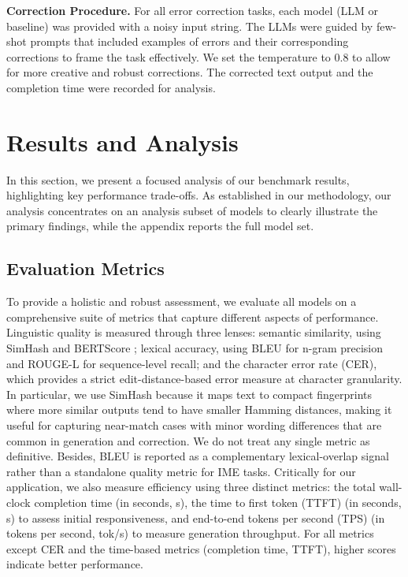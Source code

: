 \documentclass[10pt, a4paper]{article}
\begin{document}
\textbf{Correction Procedure.}
For all error correction tasks, each model (LLM or baseline) was provided with a noisy input string. The LLMs were guided by few-shot prompts that included examples of errors and their corresponding corrections to frame the task effectively. We set the {temperature} to 0.8 to allow for more creative and robust corrections. The corrected text output and the completion time were recorded for analysis.

\section{Results and Analysis}
\label{sec:results}

In this section, we present a focused analysis of our benchmark results, highlighting key performance trade-offs. As established in our methodology, our analysis concentrates on an analysis subset of models to clearly illustrate the primary findings, while the appendix reports the full model set.

\subsection{Evaluation Metrics}

To provide a holistic and robust assessment, we evaluate all models on a comprehensive suite of metrics that capture different aspects of performance. Linguistic quality is measured through three lenses: {semantic similarity}, using SimHash and BERTScore \citep{zhang2019bertscore}; {lexical accuracy}, using BLEU \citep{papineni2002bleu} for n-gram precision and ROUGE-L \citep{lin2004rouge} for sequence-level recall; and the {character error rate (CER)}, which provides a strict edit-distance-based error measure at character granularity. In particular, we use SimHash because it maps text to compact fingerprints where more similar outputs tend to have smaller Hamming distances, making it useful for capturing near-match cases with minor wording differences that are common in generation and correction. We do not treat any single metric as definitive. Besides, BLEU is reported as a complementary lexical-overlap signal rather than a standalone quality metric for IME tasks. Critically for our application, we also measure {efficiency} using three distinct metrics: the total wall-clock {completion time} (in seconds, s), the {time to first token (TTFT)} (in seconds, s) to assess initial responsiveness, and end-to-end {tokens per second (TPS)} (in tokens per second, tok/s) to measure generation throughput.
For all metrics except CER and the time-based metrics (completion time, TTFT), higher scores indicate better performance. 
\end{document}
